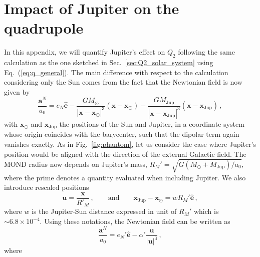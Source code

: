 \documentclass[reprint,nofootinbib,prd,aps]{revtex4-2}
\begin{document}
\section{Impact of Jupiter on the quadrupole}\label{app:Jupiter}
In this appendix, we will quantify Jupiter's effect on $Q_2$ following the same calculation as the one sketched in Sec.~\ref{sec:Q2_solar_system} using Eq.~(\ref{eq:q_general}). The main difference with respect to the calculation considering only the Sun comes from the fact that the Newtonian field is now given by
\begin{equation}\label{eq:gN_Jup}
    \frac{\bm a^N}{a_0} =  e_N \hat{\bm e} - \frac{GM_\odot}{\left|\bm x-\bm x_\odot\right|^3}(\bm x-\bm x_\odot)  -  \frac{GM_\mathrm{Jup}}{\left|\bm x-\bm x_\mathrm{Jup}\right|^3} (\bm x-\bm x_\mathrm{Jup}) \, ,
\end{equation}
with $\bm x_\odot$ and $\bm x_\mathrm{Jup}$ the positions of the Sun and Jupiter, in a coordinate system whose origin coincides with the barycenter, such that the dipolar term again vanishes exactly. As in Fig.~\ref{fig:phantom}, let us consider the case where Jupiter's position would be aligned with the direction of the external Galactic field. The MOND radius now depends on Jupiter's mass,
$R_M' = \sqrt{G(M_\odot +M_\mathrm{Jup})/a_0}$,
where the prime denotes a quantity evaluated when including Jupiter. We also introduce rescaled positions
\begin{equation}
    \bm u = \frac{\bm x}{R'_M} \, , \qquad \mathrm{and}\qquad \bm x_\mathrm{Jup} -\bm x_\odot = w R_M'\hat {\bm e} \, ,
\end{equation}
where $w$ is the Jupiter-Sun distance expressed in unit of $R_M'$ which is $\sim 6.8\times 10^{-4}$. Using these notations, the Newtonian field can be written as
\begin{equation}\label{eq:gN_Jup2}
    \frac{\bm a^N}{a_0} = e_N' \hat{\bm e} - \alpha' \frac{\bm u}{\left|\bm u\right|^3}   \, ,
\end{equation}
where 
\end{document}
